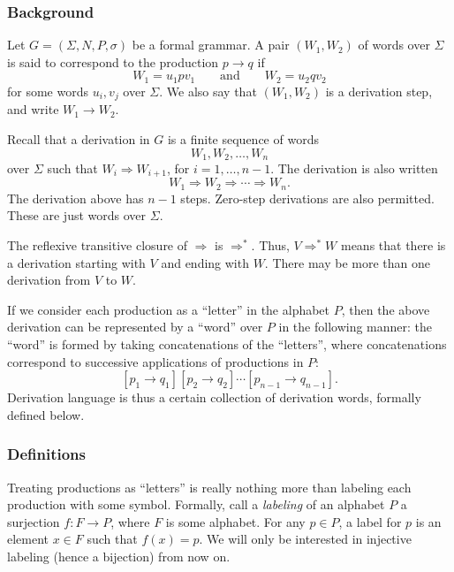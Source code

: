 \documentclass[12pt]{article}
\begin{document}
\subsubsection*{Background}

Let $G=(\Sigma,N,P,\sigma)$ be a formal grammar.  A pair $(W_1,W_2)$ of words over $\Sigma$ is said to correspond to the production $p\to q$ if $$W_1= u_1 p v_1\qquad\mbox{and}\qquad W_2=u_2 q v_2$$ for some words $u_i,v_j$ over $\Sigma$.  We also say that $(W_1,W_2)$ is a derivation step, and write $W_1\to W_2$.  

Recall that a derivation in $G$ is a finite sequence of words $$W_1,W_2, \ldots, W_n$$ over $\Sigma$ such that $W_i \Rightarrow W_{i+1}$, for $i=1,\ldots,n-1$.  The derivation is also written $$W_1\Rightarrow W_2 \Rightarrow \cdots \Rightarrow W_n.$$
The derivation above has $n-1$ steps.  Zero-step derivations are also permitted.  These are just words over $\Sigma$.

The reflexive transitive closure of $\Rightarrow$ is $\Rightarrow^*$.  Thus, $V\Rightarrow^*W$ means that there is a derivation starting with $V$ and ending with $W$.  There may be more than one derivation from $V$ to $W$.

If we consider each production as a ``letter'' in the alphabet $P$, then the above derivation can be represented by a ``word'' over $P$ in the following manner: the ``word'' is formed by taking concatenations of the ``letters'', where concatenations correspond to successive applications of productions in $P$:
$$[p_1\to q_1][p_2\to q_2]\cdots [p_{n-1}\to q_{n-1}].$$
Derivation language is thus a certain collection of derivation words, formally defined below.

\subsubsection*{Definitions}

Treating productions as ``letters'' is really nothing more than labeling each production with some symbol.  Formally, call a \emph{labeling} of an alphabet $P$ a surjection $f: F\to P$, where $F$ is some alphabet.  For any $p\in P$, a label for $p$ is an element $x\in F$ such that $f(x)=p$.  We will only be interested in injective labeling (hence a bijection) from now on.
\end{document}
